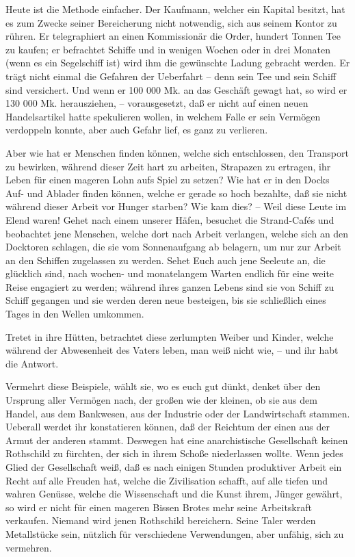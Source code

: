 \documentclass{scrbook}
\begin{document}
Heute ist die Methode einfacher. Der Kaufmann, welcher ein Kapital besitzt, hat es zum Zwecke seiner Bereicherung nicht notwendig, sich aus seinem Kontor zu rühren. Er telegraphiert an einen Kommissionär die Order, hundert Tonnen Tee zu kaufen; er befrachtet Schiffe und in wenigen Wochen oder in drei Monaten (wenn es ein Segelschiff ist) wird ihm die gewünschte Ladung gebracht werden. Er trägt nicht einmal die Gefahren der Ueberfahrt – denn sein Tee und sein Schiff sind versichert. Und wenn er 100 000 Mk. an das Geschäft gewagt hat, so wird er 130 000 Mk. herausziehen, – vorausgesetzt, daß er nicht auf einen neuen Handelsartikel hatte spekulieren wollen, in welchem Falle er sein Vermögen verdoppeln konnte, aber auch Gefahr lief, es ganz zu verlieren.

Aber wie hat er Menschen finden können, welche sich entschlossen, den Transport zu bewirken, während dieser Zeit hart zu arbeiten, Strapazen zu ertragen, ihr Leben für einen mageren Lohn aufs Spiel zu setzen? Wie hat er in den Docks Auf- und Ablader finden können, welche er gerade so hoch bezahlte, daß sie nicht während dieser Arbeit vor Hunger starben? Wie kam dies? – Weil diese Leute im Elend waren! Gehet nach einem unserer Häfen, besuchet die Strand-Cafés und beobachtet jene Menschen, welche dort nach Arbeit verlangen, welche sich an den Docktoren schlagen, die sie vom Sonnenaufgang ab belagern, um nur zur Arbeit an den Schiffen zugelassen zu werden. Sehet Euch auch jene Seeleute an, die glücklich sind, nach wochen- und monatelangem Warten endlich für eine weite Reise engagiert zu werden; während ihres ganzen Lebens sind sie von Schiff zu Schiff gegangen und sie werden deren neue besteigen, bis sie schließlich eines Tages in den Wellen umkommen.

Tretet in ihre Hütten, betrachtet diese zerlumpten Weiber und Kinder, welche während der Abwesenheit des Vaters leben, man weiß nicht wie, – und ihr habt die Antwort.

Vermehrt diese Beispiele, wählt sie, wo es euch gut dünkt, denket über den Ursprung aller Vermögen nach, der großen wie der kleinen, ob sie aus dem Handel, aus dem Bankwesen, aus der Industrie oder der Landwirtschaft stammen. Ueberall werdet ihr konstatieren können, daß der Reichtum der einen aus der Armut der anderen stammt. Deswegen hat eine anarchistische Gesellschaft keinen Rothschild zu fürchten, der sich in ihrem Schoße niederlassen wollte. Wenn jedes Glied der Gesellschaft weiß, daß es nach einigen Stunden produktiver Arbeit ein Recht auf alle Freuden hat, welche die Zivilisation schafft, auf alle tiefen und wahren Genüsse, welche die Wissenschaft und die Kunst ihrem, Jünger gewährt, so wird er nicht für einen mageren Bissen Brotes mehr seine Arbeitskraft verkaufen. Niemand wird jenen Rothschild bereichern. Seine Taler werden Metallstücke sein, nützlich für verschiedene Verwendungen, aber unfähig, sich zu vermehren.
\end{document}
